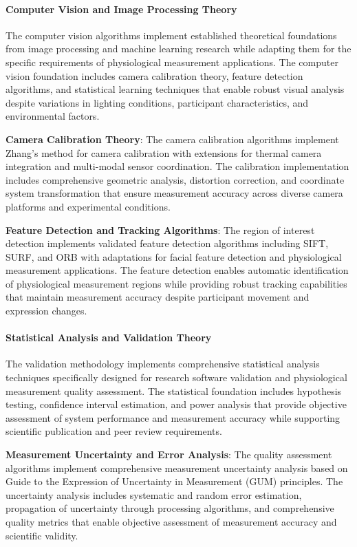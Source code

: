 \documentclass[12pt,a4paper]{report}
\begin{document}
\paragraph{Computer Vision and Image Processing Theory}

The computer vision algorithms implement established theoretical foundations from image processing and machine learning
research while adapting them for the specific requirements of physiological measurement applications. The computer
vision foundation includes camera calibration theory, feature detection algorithms, and statistical learning techniques
that enable robust visual analysis despite variations in lighting conditions, participant characteristics, and
environmental factors.

\textbf{Camera Calibration Theory}: The camera calibration algorithms implement Zhang's method for camera calibration with
extensions for thermal camera integration and multi-modal sensor coordination. The calibration implementation includes
comprehensive geometric analysis, distortion correction, and coordinate system transformation that ensure measurement
accuracy across diverse camera platforms and experimental conditions.

\textbf{Feature Detection and Tracking Algorithms}: The region of interest detection implements validated feature detection
algorithms including SIFT, SURF, and ORB with adaptations for facial feature detection and physiological measurement
applications. The feature detection enables automatic identification of physiological measurement regions while
providing robust tracking capabilities that maintain measurement accuracy despite participant movement and expression
changes.

\paragraph{Statistical Analysis and Validation Theory}

The validation methodology implements comprehensive statistical analysis techniques specifically designed for research
software validation and physiological measurement quality assessment. The statistical foundation includes hypothesis
testing, confidence interval estimation, and power analysis that provide objective assessment of system performance and
measurement accuracy while supporting scientific publication and peer review requirements.

\textbf{Measurement Uncertainty and Error Analysis}: The quality assessment algorithms implement comprehensive measurement
uncertainty analysis based on Guide to the Expression of Uncertainty in Measurement (GUM) principles. The uncertainty
analysis includes systematic and random error estimation, propagation of uncertainty through processing algorithms, and
comprehensive quality metrics that enable objective assessment of measurement accuracy and scientific validity.
\end{document}
